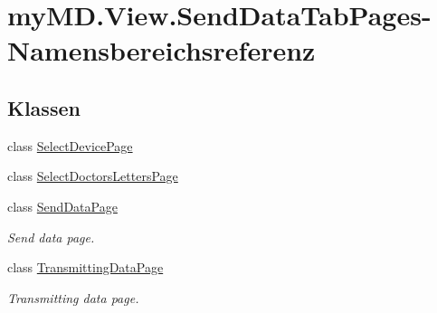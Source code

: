 \hypertarget{namespacemy_m_d_1_1_view_1_1_send_data_tab_pages}{}\section{my\+M\+D.\+View.\+Send\+Data\+Tab\+Pages-\/\+Namensbereichsreferenz}
\label{namespacemy_m_d_1_1_view_1_1_send_data_tab_pages}
\subsection*{Klassen}
\begin{DoxyCompactItemize}
\item 
class \mbox{\hyperlink{classmy_m_d_1_1_view_1_1_send_data_tab_pages_1_1_select_device_page}{Select\+Device\+Page}}
\item 
class \mbox{\hyperlink{classmy_m_d_1_1_view_1_1_send_data_tab_pages_1_1_select_doctors_letters_page}{Select\+Doctors\+Letters\+Page}}
\item 
class \mbox{\hyperlink{classmy_m_d_1_1_view_1_1_send_data_tab_pages_1_1_send_data_page}{Send\+Data\+Page}}
\begin{DoxyCompactList}\small\item\em Send data page. \end{DoxyCompactList}\item 
class \mbox{\hyperlink{classmy_m_d_1_1_view_1_1_send_data_tab_pages_1_1_transmitting_data_page}{Transmitting\+Data\+Page}}
\begin{DoxyCompactList}\small\item\em Transmitting data page. \end{DoxyCompactList}\end{DoxyCompactItemize}
